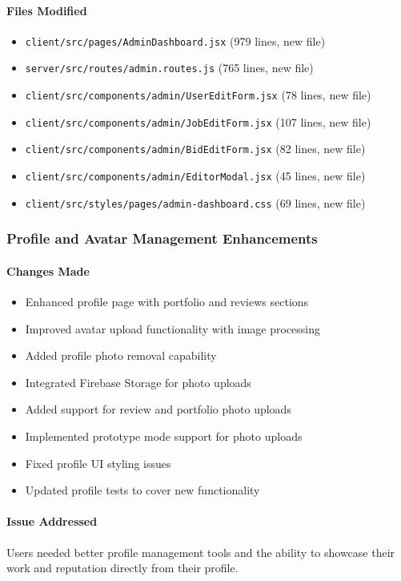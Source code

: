 \documentclass[11pt]{article}
\begin{document}
\paragraph{Files Modified}
\begin{itemize}[leftmargin=1.4em]
  \item \texttt{client/src/pages/AdminDashboard.jsx} (979 lines, new file)
  \item \texttt{server/src/routes/admin.routes.js} (765 lines, new file)
  \item \texttt{client/src/components/admin/UserEditForm.jsx} (78 lines, new file)
  \item \texttt{client/src/components/admin/JobEditForm.jsx} (107 lines, new file)
  \item \texttt{client/src/components/admin/BidEditForm.jsx} (82 lines, new file)
  \item \texttt{client/src/components/admin/EditorModal.jsx} (45 lines, new file)
  \item \texttt{client/src/styles/pages/admin-dashboard.css} (69 lines, new file)
\end{itemize}

\subsubsection{Profile and Avatar Management Enhancements}
\paragraph{Changes Made}
\begin{itemize}[leftmargin=1.4em]
  \item Enhanced profile page with portfolio and reviews sections
  \item Improved avatar upload functionality with image processing
  \item Added profile photo removal capability
  \item Integrated Firebase Storage for photo uploads
  \item Added support for review and portfolio photo uploads
  \item Implemented prototype mode support for photo uploads
  \item Fixed profile UI styling issues
  \item Updated profile tests to cover new functionality
\end{itemize}

\paragraph{Issue Addressed}
Users needed better profile management tools and the ability to showcase their work and reputation directly from their profile.
\end{document}
